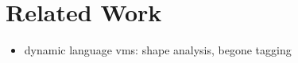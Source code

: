 \section{Related Work}
\label{sec:related}


\begin{itemize}
  \item dynamic language vms: shape analysis, begone tagging
\end{itemize}
